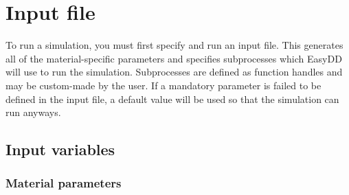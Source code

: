 \documentclass[a4paper,12pt]{article}
\begin{document}
\section{Input file}

To run a simulation, you must first specify and run an input file. This generates all of the material-specific parameters and specifies subprocesses which EasyDD will use to run the simulation. Subprocesses are defined as function handles and may be custom-made by the user. If a mandatory parameter is failed to be defined in the input file, a default value will be used so that the simulation can run anyways.

\subsection{Input variables}

\subsubsection*{Material parameters}
\end{document}
